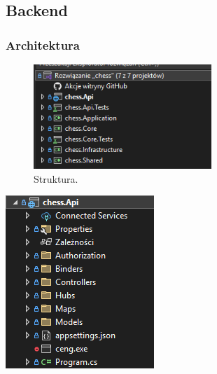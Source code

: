 \documentclass[12pt,a4paper]{article}
\begin{document}
\newpage

\subsection{Backend}
\subsubsection{Architektura}

\begin{figure}[h!]
    \centering
    \includegraphics[width=0.6\textwidth]{zdj/struktura_back.png}
    \caption{Struktura.}
\end{figure}

\newpage

\begin{minipage}[t]{0.45\textwidth}
    \vspace{0pt}
    \raggedright
    \lipsum[1] 
\end{minipage}
\hfill
\begin{minipage}[t]{0.45\textwidth}
    \vspace{0pt}
    \centering
    \includegraphics[width=\linewidth]{zdj/struktura_back_api.png}
\end{minipage}
\end{document}
